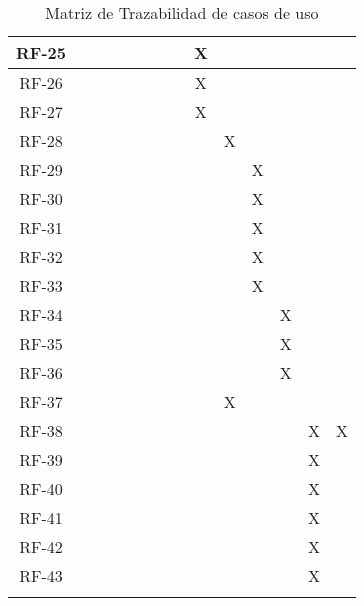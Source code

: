 \begin{center}
\begin{longtable}{ c || c c c c c c c c c c c c c  }
	RF-25 &  &  &  &  &  &  &  & X &  &  &  &  &  \\ \hline
	RF-26 &  &  &  &  &  &  &  & X &  &  &  &  &  \\ \hline
	RF-27 &  &  &  &  &  &  &  & X &  &  &  &  &  \\ \hline
	RF-28 &  &  &  &  &  &  &  &  & X &  &  &  &  \\ \hline
	RF-29 &  &  &  &  &  &  &  &  &  & X &  &  &  \\ \hline
	RF-30 &  &  &  &  &  &  &  &  &  & X &  &  &  \\ \hline
	RF-31 &  &  &  &  &  &  &  &  &  & X &  &  &  \\ \hline
	RF-32 &  &  &  &  &  &  &  &  &  & X &  &  &  \\ \hline
	RF-33 &  &  &  &  &  &  &  &  &  & X &  &  &  \\ \hline
	RF-34 &  &  &  &  &  &  &  &  &  &  & X &  &  \\ \hline
	RF-35 &  &  &  &  &  &  &  &  &  &  & X &  &  \\ \hline
	RF-36 &  &  &  &  &  &  &  &  &  &  & X &  &  \\ \hline
	RF-37 &  &  &  &  &  &  &  &  & X &  &  &  &  \\ \hline
	RF-38 &  &  &  &  &  &  &  &  &  &  &  & X & X \\ \hline
	RF-39 &  &  &  &  &  &  &  &  &  &  &  & X &  \\ \hline
	RF-40 &  &  &  &  &  &  &  &  &  &  &  & X &  \\ \hline
	RF-41 &  &  &  &  &  &  &  &  &  &  &  & X &  \\ \hline
	RF-42 &  &  &  &  &  &  &  &  &  &  &  & X &  \\ \hline
	RF-43 &  &  &  &  &  &  &  &  &  &  &  & X &  \\ \hline
\caption{Matriz de Trazabilidad de casos de uso}
\label{tab:matriztraz}
\end{longtable}
\end{center}
